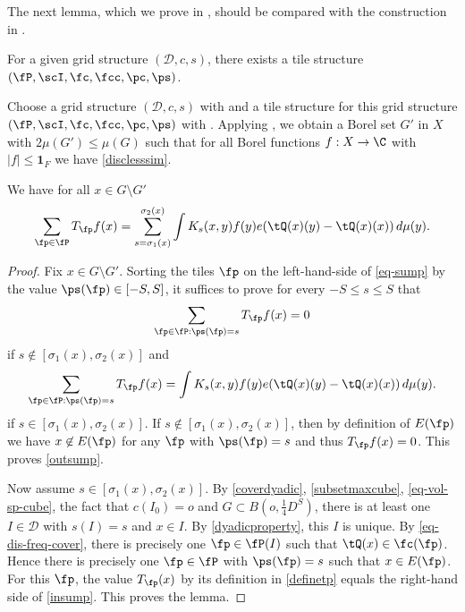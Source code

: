 The next lemma, which we prove in , should be compared
with the construction in \cite[Lemma 2.12]{zk-polynomial}.

\begin{lemma}
    \label{tile-structure}
    \leanok
        For a given grid structure $(\mathcal{D}, c,s)$, there exists a tile structure
        $(\fP,\scI,\fc,\fcc,\pc,\ps)$.
\end{lemma}

Choose a grid structure $(\mathcal{D}, c,s)$ with  and a tile structure for this
grid structure $(\fP,\scI,\fc,\fcc,\pc,\ps)$ with .
Applying , we obtain a Borel set $G'$ in $X$ with $2\mu(G')\leq \mu(G)$ such that for all Borel functions $f:X\to \C$ with $|f|\le \mathbf{1}_F$
we have \eqref{disclesssim}.

\begin{lemma}
    \label{tile-sum-operator}
    \leanok
    We have for all $x\in G\setminus G'$
    \begin{equation}\label{eq-sump}
        \sum_{\fp\in \fP}T_{\fp} f(x)= \sum_{s=\sigma_1(x)}^{\sigma_2(x)}
        \int K_{s}(x,y) f(y) e(\tQ(x)(y)-\tQ(x)(x))\, d\mu(y).
    \end{equation}
\end{lemma}
\begin{proof}
    \leanok
    Fix $x\in G\setminus G'$.
    Sorting the tiles $\fp$ on the left-hand-side of \eqref{eq-sump} by the value $\ps(\fp)\in [-S,S]$,
    it suffices to prove for every $-S\le s\le S$ that
    \begin{equation}\label{outsump}
        \sum_{\fp\in \fP: \ps(\fp)=s}T_{\fp} f(x)=0
    \end{equation}
    if $s\not\in [\sigma_1(x), \sigma_2(x)]$ and
    \begin{equation}\label{insump}
        \sum_{\fp\in \fP: \ps(\fp)=s}T_{\fp} f(x)=
        \int K_{s}(x,y) f(y) e(\tQ(x)(y) - \tQ(x)(x))\, d\mu(y).
    \end{equation}
    if $s\in [\sigma_1(x),\sigma_2(x)]$.
    If $s\not\in [\sigma_1(x), \sigma_2(x)]$, then by definition of $E(\fp)$ we have
    $x\not\in E(\fp)$ for any $\fp$ with $\ps(\fp)=s$ and thus $T_{\fp} f(x)=0$. This proves
    \eqref{outsump}.

    Now assume $s\in [\sigma_1(x),\sigma_2(x)]$.
    By \eqref{coverdyadic}, \eqref{subsetmaxcube}, \eqref{eq-vol-sp-cube}, the fact that $c(I_0) = o$ and $G\subset B(o,\frac 14 D^S)$, there is at least
    one $I\in \mathcal{D}$ with $s(I)=s$ and $x\in I$.
    By \eqref{dyadicproperty}, this $I$ is unique. By \eqref{eq-dis-freq-cover}, there is precisely one $\fp\in \fP(I)$ such that
    $\tQ(x)\in \fc(\fp)$. Hence there is precisely one $\fp\in \fP$ with $\ps(\fp)=s$ such that
    $x\in E(\fp)$. For this $\fp$, the value $T_{\fp}(x)$ by its definition in \eqref{definetp}
    equals the right-hand side of \eqref{insump}. This proves the lemma.
\end{proof}

